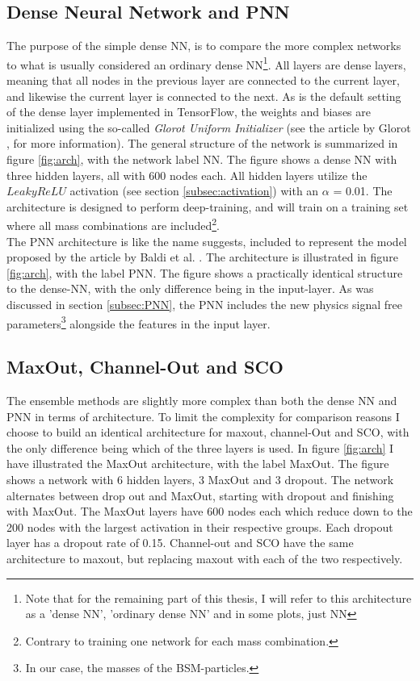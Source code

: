 \subsection*{Dense Neural Network and PNN}\label{subsec:PNNArch}
The purpose of the simple dense \ac{NN}, is to compare the more complex networks to what is usually considered an ordinary dense \ac{NN}\footnote{Note 
that for the remaining part of this thesis, I will refer to this architecture as a 'dense \ac{NN}', 'ordinary dense \ac{NN}' and in some plots, just 
\ac{NN}}.
All layers are dense layers, meaning that all nodes in the previous layer are connected to the current layer, and likewise
the current layer is connected to the next. As is the default setting of the dense layer implemented in TensorFlow, the weights and biases are initialized 
using the so-called \emph{Glorot Uniform Initializer} (see the article by Glorot \cite{glorot_understanding_2010}, for more information). 
The general structure of the network is summarized in figure \ref{fig:arch}, with the network label \ac{NN}. The figure shows a dense \ac{NN} with 
three hidden layers, all with 600 nodes each. All hidden layers utilize the $LeakyReLU$ activation (see section \ref{subsec:activation})
with an $\alpha$ = 0.01. The architecture is designed to perform deep-training, and will train on a training set where all mass combinations 
are included\footnote{Contrary to training one network for each mass combination.}. 
\\
The \ac{PNN} architecture is like the name suggests, included to represent the model proposed by the article by Baldi et al. \cite{PNN}.
The architecture is illustrated in figure \ref{fig:arch}, with the label PNN. The figure shows a practically identical 
structure to the dense-\ac{NN}, with the only difference being in the input-layer. As was discussed in section \ref{subsec:PNN},
the \ac{PNN} includes the new physics signal free parameters\footnote{In our case, the masses of the \ac{BSM}-particles.} alongside the features
in the input layer.
\subsection*{MaxOut, Channel-Out and \ac{SCO}}
The ensemble methods are slightly more complex than both the dense \ac{NN} and \ac{PNN} in terms of architecture. To limit the complexity for comparison reasons
I choose to build an identical architecture for maxout, channel-Out and \ac{SCO}, with the only difference being which of the three layers is used.  
In figure \ref{fig:arch} I have illustrated the MaxOut architecture, with the label MaxOut. The figure shows a network with 6 hidden layers, 
3 MaxOut and 3 dropout. The network alternates between drop out and MaxOut, starting with dropout and finishing with MaxOut. The MaxOut layers 
have 600 nodes each which reduce down to the 200 nodes with the largest activation in their respective groups. Each dropout layer has a dropout 
rate of 0.15. Channel-out and \ac{SCO} have the same architecture to maxout, but replacing maxout with each of the two respectively. 

